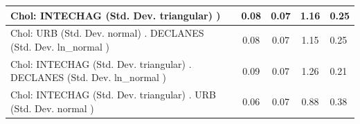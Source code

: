 \begin{table}
\begin{center}
\begin{tabular}{|l|l|c|c|c|l|}
			\hline
			 Chol: INTECHAG (Std. Dev. triangular) ) &  & 0.08 & 0.07 & 1.16 & 0.25 \\
			\hline
			 Chol: URB (Std. Dev. normal) . DECLANES (Std. Dev.   ln_normal ) &  & 0.08 & 0.07 & 1.15 & 0.25 \\
			\hline
			 Chol: INTECHAG (Std. Dev. triangular) . DECLANES (Std. Dev.   ln_normal ) &  & 0.09 & 0.07 & 1.26 & 0.21 \\
			\hline
			 Chol: INTECHAG (Std. Dev. triangular) . URB (Std. Dev.   normal ) &  & 0.06 & 0.07 & 0.88 & 0.38 \\
			\hline
		\end{tabular}
	\end{center}
\end{table}
